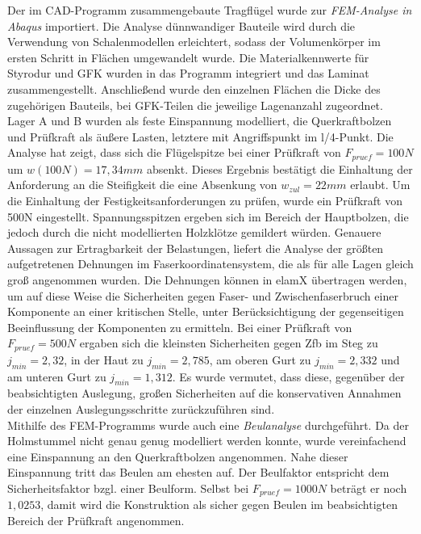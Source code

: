 \noindent Der im CAD-Programm zusammengebaute Tragflügel wurde zur \textit{FEM-Analyse in Abaqus} importiert. Die Analyse dünnwandiger Bauteile wird durch die Verwendung von Schalenmodellen erleichtert, sodass der Volumenkörper im ersten Schritt in Flächen umgewandelt wurde. Die Materialkennwerte für Styrodur und GFK wurden in das Programm integriert und das Laminat zusammengestellt. Anschließend wurde den einzelnen Flächen die Dicke des zugehörigen Bauteils, bei GFK-Teilen die jeweilige Lagenanzahl zugeordnet. Lager A und B wurden als feste Einspannung modelliert, die Querkraftbolzen und Prüfkraft als äußere Lasten, letztere mit Angriffspunkt im l/4-Punkt. Die Analyse hat zeigt, dass sich die Flügelspitze bei einer Prüfkraft von $ F_{pruef}=100N $ um $ w(100N)=17,34mm $ absenkt. Dieses Ergebnis bestätigt die Einhaltung der Anforderung an die Steifigkeit die eine Absenkung von $ w_{zul}=22mm $ erlaubt. Um die Einhaltung der Festigkeitsanforderungen zu prüfen, wurde ein Prüfkraft von 500N eingestellt. Spannungsspitzen ergeben sich im Bereich der Hauptbolzen, die jedoch durch die nicht modellierten Holzklötze gemildert würden. Genauere Aussagen zur Ertragbarkeit der Belastungen, liefert die Analyse der größten aufgetretenen Dehnungen im Faserkoordinatensystem, die als für alle Lagen gleich groß angenommen wurden. Die Dehnungen können in elamX übertragen werden, um auf diese Weise die Sicherheiten gegen Faser- und Zwischenfaserbruch einer Komponente an einer kritischen Stelle, unter Berücksichtigung der gegenseitigen Beeinflussung der Komponenten zu ermitteln. Bei einer Prüfkraft von $ F_{pruef}=500N $ ergaben sich die kleinsten Sicherheiten gegen Zfb im Steg zu $ j_{min}=2,32 $, in der Haut zu $ j_{min}=2,785 $, am oberen Gurt zu $ j_{min}=2,332 $ und am unteren Gurt zu $ j_{min} =1,312$. Es wurde vermutet, dass diese, gegenüber der beabsichtigten Auslegung, großen Sicherheiten auf die konservativen Annahmen der einzelnen Auslegungsschritte zurückzuführen sind.\\

\noindent Mithilfe des FEM-Programms wurde auch eine \textit{Beulanalyse} durchgeführt. Da der Holmstummel nicht genau genug modelliert werden konnte, wurde vereinfachend eine Einspannung an den Querkraftbolzen angenommen. Nahe dieser Einspannung tritt das Beulen am ehesten auf. Der Beulfaktor entspricht dem Sicherheitsfaktor bzgl. einer Beulform. Selbst bei $ F_{pruef}=1000N $ beträgt er noch $ 1,0253 $, damit wird die Konstruktion als sicher gegen Beulen im beabsichtigten Bereich der Prüfkraft angenommen.





